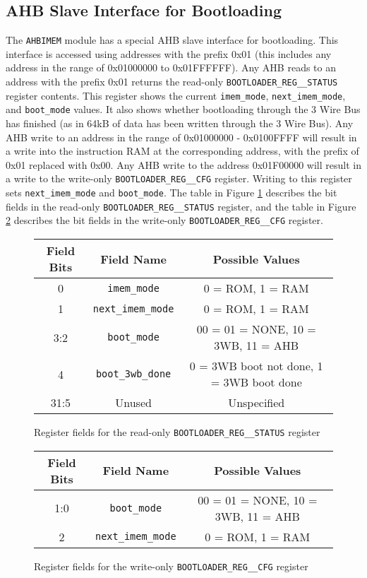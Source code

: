 \subsection{AHB Slave Interface for Bootloading}
The \texttt{AHBIMEM} module has a special AHB slave interface for bootloading. This interface is accessed using addresses with the prefix 0x01 (this includes any address in the range of 0x01000000 to 0x01FFFFFF). Any AHB reads to an address with the prefix 0x01 returns the read-only \texttt{BOOTLOADER\_REG\_\_STATUS} register contents. This register shows the current \texttt{imem\_mode}, \texttt{next\_imem\_mode}, and \texttt{boot\_mode} values. It also shows whether bootloading through the 3 Wire Bus has finished (as in 64kB of data has been written through the 3 Wire Bus). Any AHB write to an address in the range of 0x01000000 - 0x0100FFFF will result in a write into the instruction RAM at the corresponding address, with the prefix of 0x01 replaced with 0x00. Any AHB write to the address 0x01F00000 will result in a write to the write-only \texttt{BOOTLOADER\_REG\_\_CFG} register. Writing to this register sets \texttt{next\_imem\_mode} and \texttt{boot\_mode}. The table in Figure \ref{table:boot-reg-status} describes the bit fields in the read-only \texttt{BOOTLOADER\_REG\_\_STATUS} register, and the table in Figure \ref{table:boot-reg-cfg} describes the bit fields in the write-only \texttt{BOOTLOADER\_REG\_\_CFG} register.

\begin{figure}
\centering
\begin{tabular}{|c|c|c|}
	\hline
	Field Bits & Field Name & Possible Values \\
	\hline
	0 & \texttt{imem\_mode} & 0 = ROM, 1 = RAM \\
	1 & \texttt{next\_imem\_mode} & 0 = ROM, 1 = RAM \\
	3:2 & \texttt{boot\_mode} & 00 = 01 = NONE, 10 = 3WB, 11 = AHB \\
	4 & \texttt{boot\_3wb\_done} & 0 = 3WB boot not done, 1 = 3WB boot done \\
	31:5 & Unused & Unspecified \\
	\hline
\end{tabular}
\caption{Register fields for the read-only \texttt{BOOTLOADER\_REG\_\_STATUS} register}
\label{table:boot-reg-status}
\end{figure}

\begin{figure}
\centering
\begin{tabular}{|c|c|c|}
	\hline
	Field Bits & Field Name & Possible Values \\
	\hline
	1:0 & \texttt{boot\_mode} & 00 = 01 = NONE, 10 = 3WB, 11 = AHB \\
	2 & \texttt{next\_imem\_mode} & 0 = ROM, 1 = RAM \\
	\hline
\end{tabular}
\caption{Register fields for the write-only \texttt{BOOTLOADER\_REG\_\_CFG} register}
\label{table:boot-reg-cfg}
\end{figure}

